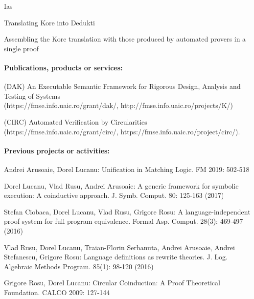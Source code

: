 \begin{sitedescription}{Ias}


\begin{compactitem}
\item Translating Kore into Dedukti
\item Assembling the Kore translation with those produced by automated provers in a single proof
\end{compactitem}

\paragraph*{Publications, products or services:}


\begin{compactitem}
\item  (DAK) An Executable Semantic Framework for Rigorous Design, Analysis and Testing of Systems\\
 (https://fmse.info.uaic.ro/grant/dak/, http://fmse.info.uaic.ro/projects/K/) 
\item (CIRC) Automated Verification by Circularities\\  (https://fmse.info.uaic.ro/grant/circ/, https://fmse.info.uaic.ro/project/circ/).
\end{compactitem}

\paragraph*{Previous projects or activities:}


\begin{compactitem}
\item Andrei Arusoaie, Dorel Lucanu:
Unification in Matching Logic. FM 2019: 502-518
\item Dorel Lucanu, Vlad Rusu, Andrei Arusoaie:
A generic framework for symbolic execution: A coinductive approach. J. Symb. Comput. 80: 125-163 (2017)
\item Stefan Ciobaca, Dorel Lucanu, Vlad Rusu, Grigore Rosu:
A language-independent proof system for full program equivalence. Formal Asp. Comput. 28(3): 469-497 (2016)
\item Vlad Rusu, Dorel Lucanu, Traian-Florin Serbanuta, Andrei Arusoaie, Andrei Stefanescu, Grigore Rosu:
Language definitions as rewrite theories. J. Log. Algebraic Methods Program. 85(1): 98-120 (2016)
\item Grigore Rosu, Dorel Lucanu: Circular Coinduction: A Proof Theoretical Foundation. CALCO 2009: 127-144
\end{compactitem}


\end{sitedescription}

